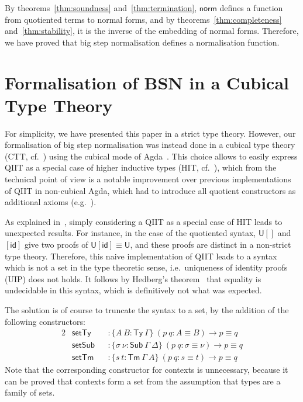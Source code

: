 \documentclass[a4paper,english]{lipics-v2019}
\newcommand{\agdaSymb}[1]{\mathsf{#1}}
\newcommand{\Ty}{\agdaSymb{Ty}}
\newcommand{\Tms}{\agdaSymb{Sub}}
\newcommand{\Tm}{\agdaSymb{Tm}}
\newcommand{\id}{\agdaSymb{id}}
\newcommand{\norm}{\agdaSymb{norm}}
\newcommand{\U}{\agdaSymb{U}}
\newcommand{\isSet}{\agdaSymb{set}}
\begin{document}
By theorems~\ref{thm:soundness} and~\ref{thm:termination}, $\norm$ defines a
function from quotiented terms to normal forms, and by
theorems~\ref{thm:completeness} and~\ref{thm:stability}, it is the inverse of
the embedding of normal forms. Therefore, we have proved that big step
normalisation defines a normalisation function.

\section{Formalisation of BSN in a Cubical Type Theory}
\label{sec:cubical}
For simplicity, we have presented this paper in a strict type theory. However,
our formalisation of big step normalisation was instead done in a cubical type
theory (CTT, cf.~\cite{cchm}) using the cubical mode of Agda~\cite{norell2007agda}.
This choice allows to easily express QIIT as a special case of higher inductive
types (HIT, cf.~\cite{hott}), which from the technical point of view is a
notable improvement over previous implementations of QIIT in non-cubical Agda,
which had to introduce all quotient constructors as additional axioms
(e.g.~\cite{kaposi2016normalisation,kaposi2016type}).

As explained in~\cite{kaposi2016type}, simply considering a QIIT as a special
case of HIT leads to unexpected results. For instance, in the case of the
quotiented syntax, $\U[]$ and $[\id]$ give two proofs of $\U[\id] \equiv \U$,
and these proofs are distinct in a non-strict type theory. Therefore, this naive
implementation of QIIT leads to a syntax which is not a set in the type theoretic
sense, i.e.\ uniqueness of identity proofs (UIP) does not holds.
It follows by Hedberg's theorem~\cite{hedberg1998coherence} that equality is
undecidable in this syntax, which is definitively not what was expected.

The solution is of course to truncate the syntax to a set, by the addition of
the following constructors:
\begin{alignat*}{2}
  & \isSet\Ty && : \{A\ B : \Ty\ \Gamma\}\ (p\ q : A \equiv B) \to p \equiv q \\
  & \isSet\Tms && : \{\sigma\ \nu : \Tms\ \Gamma\ \Delta\}\ (p\ q : \sigma \equiv \nu) \to p \equiv q \\
  & \isSet\Tm && : \{s\ t : \Tm\ \Gamma\ A\}\ (p\ q : s \equiv t) \to p \equiv q
\end{alignat*}
Note that the corresponding constructor for contexts is unnecessary, because
it can be proved that contexts form a set from the assumption that types are a
family of sets.
\end{document}
